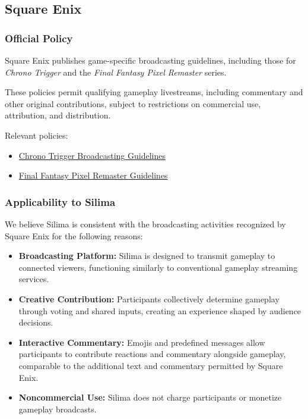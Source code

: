 
\subsection{Square Enix}

\subsubsection{Official Policy}

Square Enix publishes game-specific broadcasting
guidelines, including those for \textit{Chrono Trigger}
and the \textit{Final Fantasy Pixel Remaster} series.

These policies permit qualifying gameplay livestreams,
including commentary and other original contributions,
subject to restrictions on commercial use, attribution,
and distribution.

Relevant policies:

\begin{itemize}
    \item \href{
        https://www.square-enix-games.com/en_US/documents/chrono-trigger-guidelines-for-livestreaming-and-posting-videos-images
    }{Chrono Trigger Broadcasting Guidelines}

    \item \href{
        https://finalfantasypixelremaster.square-enix-games.com/en_US/streaming-guidelines
    }{Final Fantasy Pixel Remaster Guidelines}
\end{itemize}

\subsubsection{Applicability to Silima}

We believe Silima is consistent with the broadcasting
activities recognized by Square Enix for the following
reasons:

\begin{itemize}
    \item \textbf{Broadcasting Platform:}
    Silima is designed to transmit gameplay to connected
    viewers, functioning similarly to conventional
    gameplay streaming services.

    \item \textbf{Creative Contribution:}
    Participants collectively determine gameplay through
    voting and shared inputs, creating an experience
    shaped by audience decisions.

    \item \textbf{Interactive Commentary:}
    Emojis and predefined messages allow participants
    to contribute reactions and commentary alongside
    gameplay, comparable to the additional text and
    commentary permitted by Square Enix.

    \item \textbf{Noncommercial Use:}
    Silima does not charge participants or monetize
    gameplay broadcasts.
\end{itemize}

